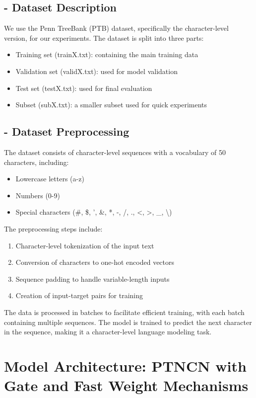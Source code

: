 \documentclass{article}
\begin{document}
\subsection{- Dataset Description}
We use the Penn TreeBank (PTB) dataset, specifically the character-level version, for our experiments. The dataset is split into three parts:
\begin{itemize}
    \item Training set (trainX.txt): containing the main training data
    \item Validation set (validX.txt): used for model validation
    \item Test set (testX.txt): used for final evaluation
    \item Subset (subX.txt): a smaller subset used for quick experiments
\end{itemize}

\subsection{- Dataset Preprocessing}
The dataset consists of character-level sequences with a vocabulary of 50 characters, including:
\begin{itemize}
    \item Lowercase letters (a-z)
    \item Numbers (0-9)
    \item Special characters (\#, \$, ', \&, *, -, /, ., <, >, \_, \textbackslash)
\end{itemize}

The preprocessing steps include:
\begin{enumerate}
    \item Character-level tokenization of the input text
    \item Conversion of characters to one-hot encoded vectors
    \item Sequence padding to handle variable-length inputs
    \item Creation of input-target pairs for training
\end{enumerate}

The data is processed in batches to facilitate efficient training, with each batch containing multiple sequences. The model is trained to predict the next character in the sequence, making it a character-level language modeling task.

\section{Model Architecture: PTNCN with Gate and Fast Weight Mechanisms}
\end{document}
